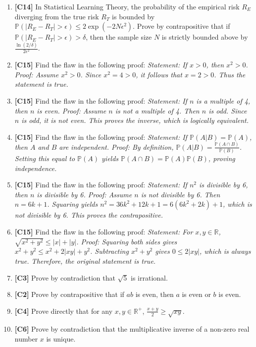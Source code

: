 \documentclass[11pt]{article}
\begin{document}
\begin{enumerate}
    \item \textbf{[C14]} In Statistical Learning Theory, the probability of the empirical risk $R_E$ diverging from the true risk $R_T$ is bounded by $\mathbb{P}(|R_E - R_T| > \epsilon) \le 2 \exp(-2N\epsilon^2)$. Prove by contrapositive that if $\mathbb{P}(|R_E - R_T| > \epsilon) > \delta$, then the sample size $N$ is strictly bounded above by $\frac{\ln(2/\delta)}{2\epsilon^2}$.
    \item \textbf{[C15]} Find the flaw in the following proof: \textit{Statement: If $x > 0$, then $x^2 > 0$. Proof: Assume $x^2 > 0$. Since $x^2 = 4 > 0$, it follows that $x = 2 > 0$. Thus the statement is true.}
    \item \textbf{[C15]} Find the flaw in the following proof: \textit{Statement: If $n$ is a multiple of 4, then $n$ is even. Proof: Assume $n$ is not a multiple of 4. Then $n$ is odd. Since $n$ is odd, it is not even. This proves the inverse, which is logically equivalent.}
    \item \textbf{[C15]} Find the flaw in the following proof: \textit{Statement: If $\mathbb{P}(A|B) = \mathbb{P}(A)$, then $A$ and $B$ are independent. Proof: By definition, $\mathbb{P}(A|B) = \frac{\mathbb{P}(A \cap B)}{\mathbb{P}(B)}$. Setting this equal to $\mathbb{P}(A)$ yields $\mathbb{P}(A \cap B) = \mathbb{P}(A)\mathbb{P}(B)$, proving independence.}
    \item \textbf{[C15]} Find the flaw in the following proof: \textit{Statement: If $n^2$ is divisible by 6, then $n$ is divisible by 6. Proof: Assume $n$ is not divisible by 6. Then $n = 6k+1$. Squaring yields $n^2 = 36k^2 + 12k + 1 = 6(6k^2 + 2k) + 1$, which is not divisible by 6. This proves the contrapositive.}
    \item \textbf{[C15]} Find the flaw in the following proof: \textit{Statement: For $x, y \in \mathbb{R}$, $\sqrt{x^2 + y^2} \le |x| + |y|$. Proof: Squaring both sides gives $x^2 + y^2 \le x^2 + 2|xy| + y^2$. Subtracting $x^2 + y^2$ gives $0 \le 2|xy|$, which is always true. Therefore, the original statement is true.}
    \item \textbf{[C3]} Prove by contradiction that $\sqrt{5}$ is irrational.
    \item \textbf{[C2]} Prove by contrapositive that if $ab$ is even, then $a$ is even or $b$ is even.
    \item \textbf{[C4]} Prove directly that for any $x, y \in \mathbb{R}^+$, $\frac{x+y}{2} \ge \sqrt{xy}$.
    \item \textbf{[C6]} Prove by contradiction that the multiplicative inverse of a non-zero real number $x$ is unique.

\end{enumerate}
\end{document}
